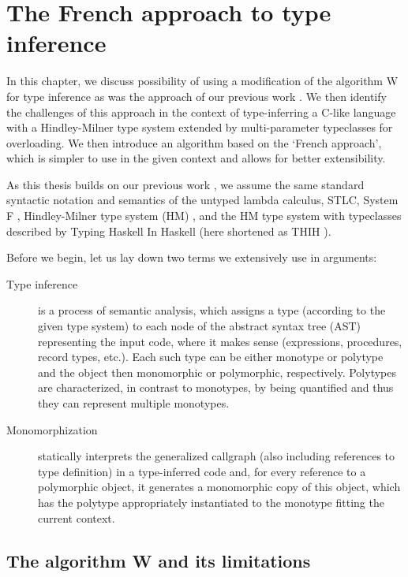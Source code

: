 \chapter{The French approach to type inference}

\label{chap1}

In this chapter, we discuss possibility of using a modification of the algorithm W \cite{damas1982principal} for type inference as was the approach of our previous work \cite{klepl2020type}. We then identify the challenges of this approach in the context of type-inferring a C-like language with a Hindley-Milner \cite{damas1982principal} type system extended by multi-parameter typeclasses for overloading. We then introduce an algorithm based on the `French approach', which is simpler to use in the given context and allows for better extensibility.

As this thesis builds on our previous work \cite{klepl2020type}, we assume the same standard syntactic notation and semantics of the untyped lambda calculus, STLC, System F \cite{barendregt1992lambda}, Hindley-Milner type system (HM) \cite{damas1982principal}, and the HM type system with typeclasses described by Typing Haskell In Haskell (here shortened as THIH \cite{jones1999typing}).

Before we begin, let us lay down two terms we extensively use in arguments:

\begin{description}
\item[Type inference] is a process of semantic analysis, which assigns a type (according to the given type system) to each node of the abstract syntax tree (AST) representing the input code, where it makes sense (expressions, procedures, record types, etc.). Each such type can be either monotype or polytype and the object then monomorphic or polymorphic, respectively. Polytypes are characterized, in contrast to monotypes, by being quantified and thus they can represent multiple monotypes.

\item[Monomorphization] statically interprets the generalized callgraph (also including references to type definition) in a type-inferred code and, for every reference to a polymorphic object, it generates a monomorphic copy of this object, which has the polytype appropriately instantiated to the monotype fitting the current context.
\end{description}

\section{The algorithm W and its limitations}

